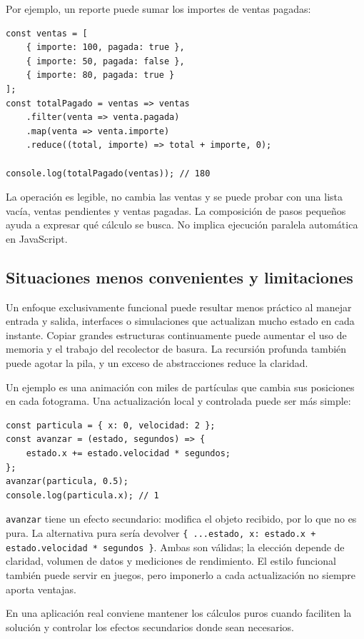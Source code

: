 \documentclass[11pt,a4paper]{article}
\begin{document}
Por ejemplo, un reporte puede sumar los importes de ventas pagadas:
\begin{lstlisting}
const ventas = [
    { importe: 100, pagada: true },
    { importe: 50, pagada: false },
    { importe: 80, pagada: true }
];
const totalPagado = ventas => ventas
    .filter(venta => venta.pagada)
    .map(venta => venta.importe)
    .reduce((total, importe) => total + importe, 0);

console.log(totalPagado(ventas)); // 180
\end{lstlisting}
La operación es legible, no cambia las ventas y se puede probar con una lista
vacía, ventas pendientes y ventas pagadas. La composición de pasos pequeños
ayuda a expresar qué cálculo se busca. No implica ejecución paralela
automática en JavaScript.

\subsection{Situaciones menos convenientes y limitaciones}
Un enfoque exclusivamente funcional puede resultar menos práctico al manejar
entrada y salida, interfaces o simulaciones que actualizan mucho estado en
cada instante. Copiar grandes estructuras continuamente puede aumentar el
uso de memoria y el trabajo del recolector de basura. La recursión profunda
también puede agotar la pila, y un exceso de abstracciones reduce la claridad.

Un ejemplo es una animación con miles de partículas que cambia sus posiciones
en cada fotograma. Una actualización local y controlada puede ser más simple:
\begin{lstlisting}
const particula = { x: 0, velocidad: 2 };
const avanzar = (estado, segundos) => {
    estado.x += estado.velocidad * segundos;
};
avanzar(particula, 0.5);
console.log(particula.x); // 1
\end{lstlisting}
\texttt{avanzar} tiene un efecto secundario: modifica el objeto recibido, por
lo que no es pura. La alternativa pura sería devolver
\texttt{\{ ...estado, x: estado.x + estado.velocidad * segundos \}}.
Ambas son válidas; la elección depende de claridad, volumen de datos y
mediciones de rendimiento. El estilo funcional también puede servir en juegos,
pero imponerlo a cada actualización no siempre aporta ventajas.

En una aplicación real conviene mantener los cálculos puros cuando faciliten
la solución y controlar los efectos secundarios donde sean necesarios.
\end{document}
